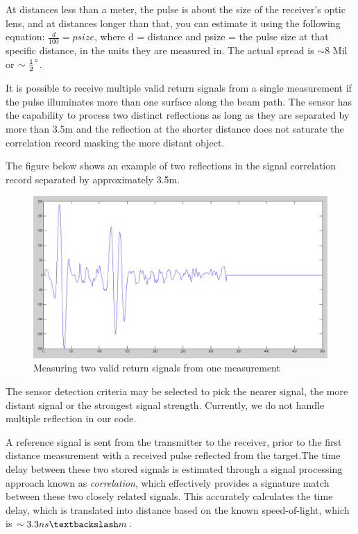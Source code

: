 At distances less than a meter, the pulse is about the size of the receiver's optic lens, and at distances longer than that, you can estimate it using the following equation: $\frac{d}{100} = psize$, where d = distance and psize = the pulse size at that specific distance, in the units they are measured in. The actual spread is $\sim 8$ Mil or $\sim\frac{1}{2}\degree$\cite{spreadofbeam}.

It is possible to receive multiple valid return signals from a single measurement if the pulse illuminates more than one surface along the beam path. The sensor has the capability to process two distinct reflections as long as they are separated by more than 3.5m and the reflection at the shorter distance does not saturate the correlation record masking the more distant object. 

The figure below shows an example of two reflections in the signal correlation record separated by approximately 3.5m.

\begin{figure}[H]
	\centering
	\includegraphics[scale=.3]{images/tworeflection.png}
	\caption{Measuring two valid return signals from one measurement~\cite{howtopulse}}
	\label{fig:tworeflections}
\end{figure}

The sensor detection criteria may be selected to pick the nearer signal, the more distant signal or the strongest signal strength. Currently, we do not handle multiple reflection in our code.

A reference signal is sent from the transmitter to the receiver, prior to the first distance measurement with a received pulse reflected from the target.The time delay between these two stored signals is estimated through a signal processing approach known as \textit{correlation}, which effectively provides a signature match between these two closely related signals. This accurately calculates the time delay, which is translated into distance based on the known speed-of-light, which is $\sim3.3ns\textbackslash m$\cite{howtopulse}.

